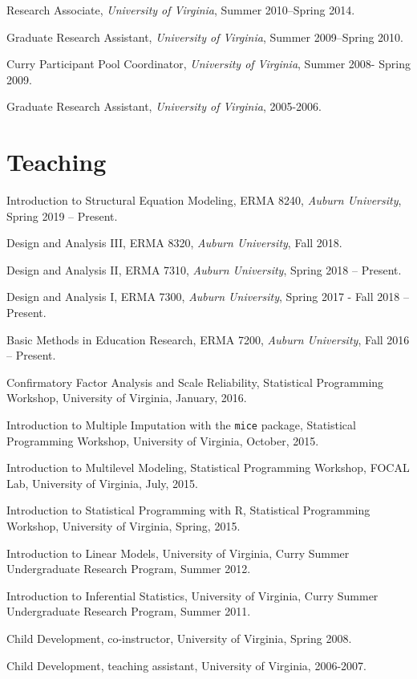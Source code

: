 \documentclass[11pt,]{article}
\begin{document}
Research Associate, \emph{University of Virginia}, Summer 2010--Spring
2014.

Graduate Research Assistant, \emph{University of Virginia}, Summer
2009--Spring 2010.

Curry Participant Pool Coordinator, \emph{University of Virginia},
Summer 2008- Spring 2009.

Graduate Research Assistant, \emph{University of Virginia}, 2005-2006.

\hypertarget{teaching}{%
\section{Teaching}\label{teaching}}

Introduction to Structural Equation Modeling, ERMA 8240, \emph{Auburn
University}, Spring 2019 -- Present.

Design and Analysis III, ERMA 8320, \emph{Auburn University}, Fall 2018.

Design and Analysis II, ERMA 7310, \emph{Auburn University}, Spring 2018
-- Present.

Design and Analysis I, ERMA 7300, \emph{Auburn University}, Spring 2017
- Fall 2018 -- Present.

Basic Methods in Education Research, ERMA 7200, \emph{Auburn
University}, Fall 2016 -- Present.

Confirmatory Factor Analysis and Scale Reliability, Statistical
Programming Workshop, University of Virginia, January, 2016.

Introduction to Multiple Imputation with the \texttt{mice} package,
Statistical Programming Workshop, University of Virginia, October, 2015.

Introduction to Multilevel Modeling, Statistical Programming Workshop,
FOCAL Lab, University of Virginia, July, 2015.

Introduction to Statistical Programming with R, Statistical Programming
Workshop, University of Virginia, Spring, 2015.

Introduction to Linear Models, University of Virginia, Curry Summer
Undergraduate Research Program, Summer 2012.

Introduction to Inferential Statistics, University of Virginia, Curry
Summer Undergraduate Research Program, Summer 2011.

Child Development, co-instructor, University of Virginia, Spring 2008.

Child Development, teaching assistant, University of Virginia,
2006-2007.
\end{document}
